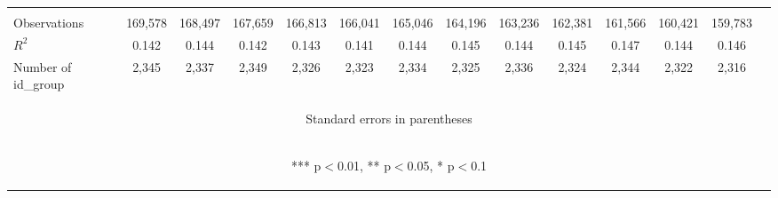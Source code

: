 \begin{table}
\begin{center}
{\begin{tabular}{lccccccccccccc}
\vspace{4pt} & \begin{footnotesize}\end{footnotesize} & \begin{footnotesize}\end{footnotesize} & \begin{footnotesize}\end{footnotesize} & \begin{footnotesize}\end{footnotesize} & \begin{footnotesize}\end{footnotesize} & \begin{footnotesize}\end{footnotesize} & \begin{footnotesize}\end{footnotesize} & \begin{footnotesize}\end{footnotesize} & \begin{footnotesize}\end{footnotesize} & \begin{footnotesize}\end{footnotesize} & \begin{footnotesize}\end{footnotesize} & \begin{footnotesize}\end{footnotesize} & \begin{footnotesize}\end{footnotesize} \\
Observations  & 169,578 & 168,497 & 167,659 & 166,813 & 166,041 & 165,046 & 164,196 & 163,236 & 162,381 & 161,566 & 160,421 & 159,783 \\
$R^2$ & 0.142 & 0.144 & 0.142 & 0.143 & 0.141 & 0.144 & 0.145 & 0.144 & 0.145 & 0.147 & 0.144 & 0.146 \\
 Number of id\_group & 2,345 & 2,337 & 2,349 & 2,326 & 2,323 & 2,334 & 2,325 & 2,336 & 2,324 & 2,344 & 2,322 & 2,316 \\ \hline
\multicolumn{14}{c}{\begin{footnotesize} Standard errors in parentheses\end{footnotesize}} \\
\multicolumn{14}{c}{\begin{footnotesize} *** p$<$0.01, ** p$<$0.05, * p$<$0.1\end{footnotesize}} \\
\end{tabular}}
\end{center}
\end{table}